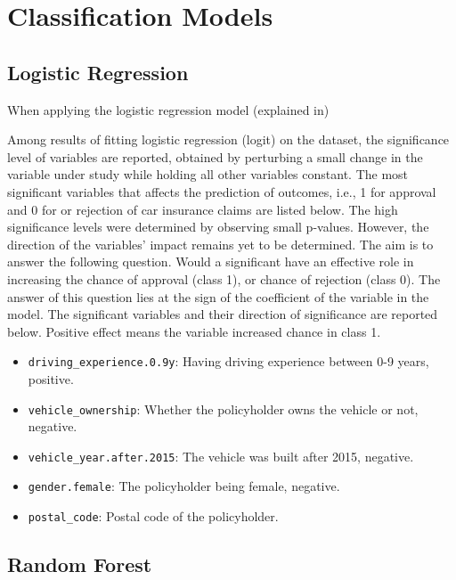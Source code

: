 \documentclass{article}
\providecommand{\tightlist}{%
  \setlength{\itemsep}{0pt}\setlength{\parskip}{0pt}}
\begin{document}
\hypertarget{classification-models}{%
\section{\texorpdfstring{Classification Models
\label{sec:modelling}}{Classification Models }}\label{classification-models}}

\hypertarget{logistic-regression}{%
\subsection{\texorpdfstring{Logistic Regression
\label{subsec:logit}}{Logistic Regression }}\label{logistic-regression}}

When applying the logistic regression model (explained in)

Among results of fitting logistic regression (logit) on the dataset, the
significance level of variables are reported, obtained by perturbing a
small change in the variable under study while holding all other
variables constant. The most significant variables that affects the
prediction of outcomes, i.e., 1 for approval and 0 for or rejection of
car insurance claims are listed below. The high significance levels were
determined by observing small p-values. However, the direction of the
variables' impact remains yet to be determined. The aim is to answer the
following question. Would a significant have an effective role in
increasing the chance of approval (class 1), or chance of rejection
(class 0). The answer of this question lies at the sign of the
coefficient of the variable in the model. The significant variables and
their direction of significance are reported below. Positive effect
means the variable increased chance in class 1.

\begin{itemize}
\tightlist
\item
  \texttt{driving\_experience.0.9y}: Having driving experience between
  0-9 years, positive.
\item
  \texttt{vehicle\_ownership}: Whether the policyholder owns the vehicle
  or not, negative.
\item
  \texttt{vehicle\_year.after.2015}: The vehicle was built after 2015,
  negative.
\item
  \texttt{gender.female}: The policyholder being female, negative.
\item
  \texttt{postal\_code}: Postal code of the policyholder.
\end{itemize}

\hypertarget{random-forest}{%
\subsection{\texorpdfstring{Random Forest
\label{subsec:rf}}{Random Forest }}\label{random-forest}}
\end{document}
